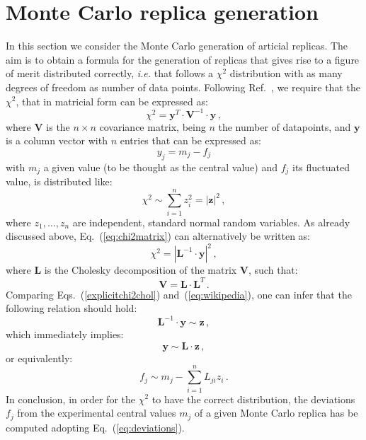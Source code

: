 \documentclass[10pt,a4paper]{article}
\begin{document}
\section{Monte Carlo replica generation}

In this section we consider the Monte Carlo generation of articial
replicas. The aim is to obtain a formula for the generation of
replicas that gives rise to a figure of merit distributed correctly,
\textit{i.e.} that follows a $\chi^2$ distribution with as many
degrees of freedom as number of data points. Following
Ref.~\cite{wiki:xxx}, we require that the $\chi^2$, that in matricial
form can be expressed as:
\begin{equation}\label{eq:chi2matrix}
  \chi^2 = \mathbf{y}^{T}\cdot \mathbf{V}^{-1} \cdot \mathbf{y}\,,
\end{equation}
where $\mathbf{V}$ is the $n\times n$ covariance matrix, being $n$ the
number of datapoints, and $\mathbf{y}$ is a column vector with $n$
entries that can be expressed as:
\begin{equation}
y_j = m_j-f_j
\end{equation}
with $m_j$ a given value (to be thought as the central value) and
$f_j$ its fluctuated value, is distributed like:
\begin{equation}\label{eq:wikipedia}
\chi^2\sim \sum_{i=1}^{n}z_i^2=|\mathbf{z}|^2\,,
\end{equation}
where $z_1,\dots , z_n$ are independent, standard normal random
variables. As already discussed above, Eq.~(\ref{eq:chi2matrix}) can
alternatively be written as:
\begin{equation}\label{explicitchi2chol}
\chi^2 = \left|\mathbf{L}^{-1}\cdot \mathbf{y}\right|^2\,,
\end{equation}
where $\mathbf{L}$ is the Cholesky decomposition of the matrix
$\mathbf{V}$, such that:
\begin{equation}\label{eq:choleskydecagain}
\mathbf{V} = \mathbf{L}\cdot\mathbf{L}^{T}\,.
\end{equation}
Comparing Eqs.~(\ref{explicitchi2chol}) and~(\ref{eq:wikipedia}), one
can infer that the following relation should hold:
\begin{equation}
\mathbf{L}^{-1}\cdot \mathbf{y}\sim\mathbf{z}\,,
\end{equation}
which immediately implies:
\begin{equation}
\mathbf{y}\sim\mathbf{L}\cdot\mathbf{z}\,,
\end{equation}
or equivalently:
\begin{equation}\label{eq:deviations}
f_j\sim m_j-\sum_{i=1}^nL_{ji}z_i\,.
\end{equation}
In conclusion, in order for the $\chi^2$ to have the correct
distribution, the deviations $f_j$ from the experimental central
values $m_j$ of a given Monte Carlo replica has be computed adopting
Eq.~(\ref{eq:deviations}).
\end{document}
